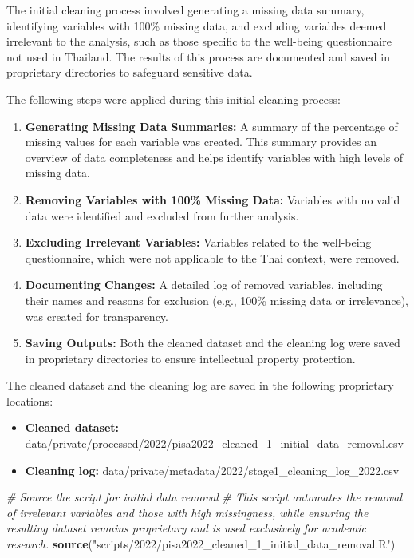 \documentclass[
]{article}
\newenvironment{Shaded}{\begin{snugshade}}{\end{snugshade}}
\newcommand{\CommentTok}[1]{\textcolor[rgb]{0.56,0.35,0.01}{\textit{#1}}}
\newcommand{\FunctionTok}[1]{\textcolor[rgb]{0.13,0.29,0.53}{\textbf{#1}}}
\newcommand{\NormalTok}[1]{#1}
\newcommand{\StringTok}[1]{\textcolor[rgb]{0.31,0.60,0.02}{#1}}
\begin{document}
The initial cleaning process involved generating a missing data summary,
identifying variables with 100\% missing data, and excluding variables
deemed irrelevant to the analysis, such as those specific to the
well-being questionnaire not used in Thailand. The results of this
process are documented and saved in proprietary directories to safeguard
sensitive data.

The following steps were applied during this initial cleaning process:

\begin{enumerate}
\def\labelenumi{\arabic{enumi}.}
\item
  \textbf{Generating Missing Data Summaries:} A summary of the
  percentage of missing values for each variable was created. This
  summary provides an overview of data completeness and helps identify
  variables with high levels of missing data.
\item
  \textbf{Removing Variables with 100\% Missing Data:} Variables with no
  valid data were identified and excluded from further analysis.
\item
  \textbf{Excluding Irrelevant Variables:} Variables related to the
  well-being questionnaire, which were not applicable to the Thai
  context, were removed.
\item
  \textbf{Documenting Changes:} A detailed log of removed variables,
  including their names and reasons for exclusion (e.g., 100\% missing
  data or irrelevance), was created for transparency.
\item
  \textbf{Saving Outputs:} Both the cleaned dataset and the cleaning log
  were saved in proprietary directories to ensure intellectual property
  protection.
\end{enumerate}

The cleaned dataset and the cleaning log are saved in the following
proprietary locations:

\begin{itemize}
\item
  \textbf{Cleaned dataset:}
  data/private/processed/2022/pisa2022\_cleaned\_1\_initial\_data\_removal.csv
\item
  \textbf{Cleaning log:}
  data/private/metadata/2022/stage1\_cleaning\_log\_2022.csv
\end{itemize}

\begin{Shaded}
\begin{Highlighting}[]
\CommentTok{\# Source the script for initial data removal}
\CommentTok{\# This script automates the removal of irrelevant variables and those with high missingness, while ensuring the resulting dataset remains proprietary and is used exclusively for academic research.}
\FunctionTok{source}\NormalTok{(}\StringTok{"scripts/2022/pisa2022\_cleaned\_1\_initial\_data\_removal.R"}\NormalTok{)}
\end{Highlighting}
\end{Shaded}
\end{document}
